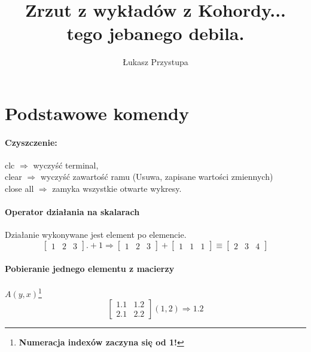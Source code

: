 \documentclass[16pt]{article}
\author{Łukasz Przystupa}
\title{Zrzut z wykładów z Kohordy... \\tego jebanego debila.}
\date{}
\begin{document}
    \maketitle
    \newpage
    \section{Podstawowe komendy}
        \paragraph*{Czyszczenie:}
            clc $\Rightarrow$ wyczyść terminal,\\
            clear $\Rightarrow$ wyczyść zawartość ramu (Usuwa, zapisane wartości zmiennych)\\
            close all $\Rightarrow$ zamyka wszystkie otwarte wykresy.

        \paragraph*{Operator działania na skalarach}
            Działanie wykonywane jest element po elemencie.
            \begin{equation*}
                \begin{bmatrix}
                    1 & 2 & 3
                \end{bmatrix}
                \textbf{$.$}+1 \Rightarrow
                \begin{bmatrix}
                    1 & 2 & 3
                \end{bmatrix}
                +
                \begin{bmatrix}
                    1 & 1 & 1
                \end{bmatrix}
                \equiv
                \begin{bmatrix}
                    2 & 3 & 4
                \end{bmatrix}
            \end{equation*}

        \paragraph*{Pobieranie jednego elementu z macierzy}
            $A(y, x)$\footnote{\textbf{Numeracja indexów zaczyna się od 1!}}
            \begin{equation*}
                \begin{bmatrix}
                    1.1 & 1.2\\
                    2.1 & 2.2
                \end{bmatrix}
                (1, 2) \Rightarrow 1.2
            \end{equation*}
\end{document}
